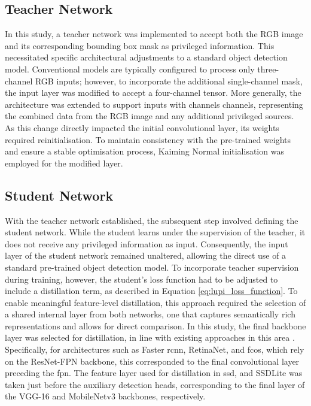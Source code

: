 \subsection{Teacher Network}
\label{subsec:4_teacher}

In this study, a teacher network was implemented to accept both the RGB image and its corresponding bounding box mask as privileged information. This necessitated specific architectural adjustments to a standard object detection model. Conventional models are typically configured to process only three-channel RGB inputs; however, to incorporate the additional single-channel mask, the input layer was modified to accept a four-channel tensor. More generally, the architecture was extended to support inputs with \gls{channels} channels, representing the combined data from the RGB image and any additional privileged sources. As this change directly impacted the initial convolutional layer, its weights required reinitialisation. To maintain consistency with the pre-trained weights and ensure a stable optimisation process, Kaiming Normal initialisation \cite{kaiming} was employed for the modified layer.

\subsection{Student Network}
\label{subsec:4_student}

With the teacher network established, the subsequent step involved defining the student network. While the student learns under the supervision of the teacher, it does not receive any privileged information as input. Consequently, the input layer of the student network remained unaltered, allowing the direct use of a standard pre-trained object detection model. To incorporate teacher supervision during training, however, the student’s loss function had to be adjusted to include a distillation term, as described in Equation \ref{eq:lupi_loss_function}. To enable meaningful feature-level distillation, this approach required the selection of a shared internal layer from both networks, one that captures semantically rich representations and allows for direct comparison. In this study, the final backbone layer was selected for distillation, in line with existing approaches in this area \cite{lab2wild, lupi_distillation, distillation2}. Specifically, for architectures such as Faster \gls{rcnn}, RetinaNet, and \gls{fcos}, which rely on the ResNet-FPN backbone, this corresponded to the final convolutional layer preceding the \gls{fpn}. The feature layer used for distillation in \gls{ssd}, and SSDLite was taken just before the auxiliary detection heads, corresponding to the final layer of the VGG-16 and MobileNetv3 backbones, respectively.


